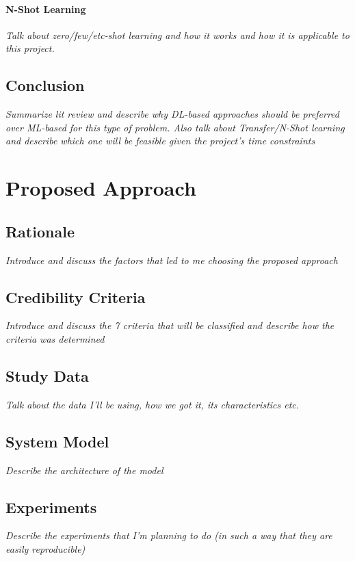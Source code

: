 \documentclass[a4paper,twoside,phd]{BYUPhys}
\begin{document}
\subsubsection{N-Shot Learning}
\label{sec:NShotLearningReview}
\textit{Talk about zero/few/etc-shot learning and how it works and how it is applicable to this project.}

\section{Conclusion}
\label{sec:LitReviewConclusion}
\textit{Summarize lit review and describe why DL-based approaches should be preferred over ML-based for this type of problem. Also talk about Transfer/N-Shot learning and describe which one will be feasible given the project's time constraints}

\chapter{Proposed Approach}
\label{chap:approach}

\section{Rationale}
\label{sec:ProposedRationale}
\textit{Introduce and discuss the factors that led to me choosing the proposed approach}


\section{Credibility Criteria}
\label{sect:CredibilityCriteria}
\textit{Introduce and discuss the 7 criteria that will be classified and describe how the criteria was determined}

\section{Study Data}
\label{sec:StudyData}
\textit{Talk about the data I'll be using, how we got it, its characteristics etc.}

\section{System Model}
\label{sect:chap2sysmodel}
\textit{Describe the architecture of the model}

\section{Experiments}
\label{sec:Experiments}
\textit{Describe the experiments that I'm planning to do (in such a way that they are easily reproducible)}
\end{document}

